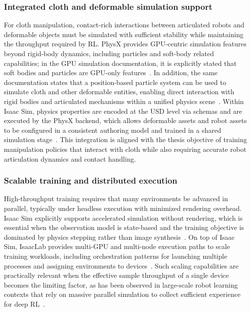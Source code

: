 \subsubsection{Integrated cloth and deformable simulation support}
For cloth manipulation, contact-rich interactions between articulated robots and deformable objects must be simulated with sufficient stability while maintaining the throughput required by \ac{RL}.
PhysX provides \ac{GPU}-centric simulation features beyond rigid-body dynamics, including particles and soft-body related capabilities; in the \ac{GPU} simulation documentation, it is explicitly stated that soft bodies and particles are \ac{GPU}-only features~\cite{physx_541_gpu_rigid_bodies}.
In addition, the same documentation states that a position-based particle system can be used to simulate cloth and other deformable entities, enabling direct interaction with rigid bodies and articulated mechanisms within a unified physics scene~\cite{physx_541_gpu_rigid_bodies}.
Within Isaac Sim, physics properties are encoded at the \ac{USD} level via schemas and are executed by the PhysX backend, which allows deformable assets and robot assets to be configured in a consistent authoring model and trained in a shared simulation stage~\cite{isaac_sim_510_physics_fundamentals,isaac_sim_510_overview}.
This integration is aligned with the thesis objective of training manipulation policies that interact with cloth while also requiring accurate robot articulation dynamics and contact handling.

\subsubsection{Scalable training and distributed execution}
High-throughput training requires that many environments be advanced in parallel, typically under headless execution with minimized rendering overhead.
Isaac Sim explicitly supports accelerated simulation without rendering, which is essential when the observation model is state-based and the training objective is dominated by physics stepping rather than image synthesis~\cite{isaac_sim_510_physics_fundamentals}.
On top of Isaac Sim, IsaacLab provides multi-\ac{GPU} and multi-node execution paths to scale training workloads, including orchestration patterns for launching multiple processes and assigning environments to devices~\cite{isaaclab_multi_gpu_doc}.
Such scaling capabilities are practically relevant when the effective sample throughput of a single device becomes the limiting factor, as has been observed in large-scale robot learning contexts that rely on massive parallel simulation to collect sufficient experience for deep \ac{RL}~\cite{Makoviychuk2021IsaacGym}.

